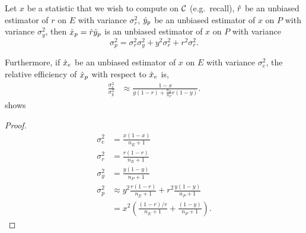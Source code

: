 \begin{lemma} 
  Let $x$ be a statistic that we wish to compute on $\mathcal{C}$ (e.g.\ recall),
    $\hat{r}$ be an unbiased estimator of $r$ on $E$ with variance $\sigma_r^2$,
    $\hat{y}_p$ be an unbiased estimator of $x$ on $P$ with variance $\sigma_y^2$,
  then $\hat{x}_p = \hat{r} \hat{y}_p$ is an unbiased estimator of $x$ on $P$ with variance
  $$
  \sigma_p^2 = \sigma_r^2 \sigma_y^2 + y^2 \sigma_r^2 + r^2 \sigma_r^2.
  $$

  Furthermore, if $\hat{x}_e$ be an unbiased estimator of $x$ on $E$ with variance $\sigma_e^2$,
  the relative efficiency of $\hat{x}_p$ with respect to $\hat{x}_e$ is,
  \begin{align*}
  \frac{\sigma_e^2}{\sigma_p^2}
  &\approx \frac{1-x}
      {
      y (1-r) + \frac{n_E}{n_P} r (1-y)
      }.
  \end{align*}
   shows 
\end{lemma}
\begin{proof}
  \begin{align*}
    \sigma_e^2 &= \frac{x (1-x)}{n_E + 1} \\
    \sigma_r^2 &= \frac{r (1-r)}{n_E + 1} \\
    \sigma_y^2 &= \frac{y (1-y)}{n_P + 1} \\
    \sigma_p^2 
    &\approx y^2 \frac{r (1-r)}{n_E + 1} + r^2 \frac{y (1-y)}{n_P + 1} \\
    &= x^2 \left( \frac{(1-r)/r}{n_E + 1} + \frac{(1-y)}{n_P + 1} \right).
  \end{align*}
\end{proof}

